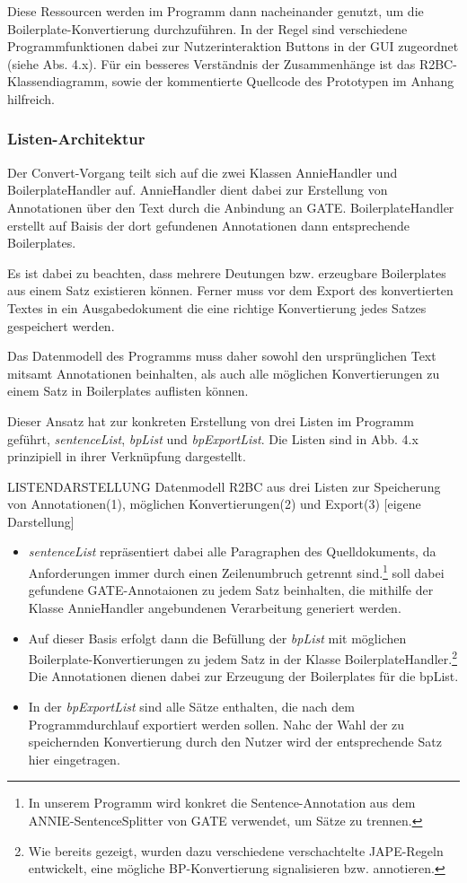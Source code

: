 \documentclass[12pt]{report}
\begin{document}
Diese Ressourcen werden im Programm dann nacheinander genutzt, um die Boilerplate-Konvertierung durchzuführen. In der Regel sind verschiedene Programmfunktionen dabei zur Nutzerinteraktion Buttons in der GUI zugeordnet (siehe Abs. 4.x). Für ein besseres Verständnis der Zusammenhänge ist das R2BC-Klassendiagramm, sowie der kommentierte Quellcode des Prototypen im Anhang hilfreich.

\subsubsection{Listen-Architektur}
Der Convert-Vorgang teilt sich auf die zwei Klassen AnnieHandler und BoilerplateHandler auf. AnnieHandler dient dabei zur Erstellung von Annotationen über den Text durch die Anbindung an GATE. BoilerplateHandler erstellt auf Baisis der dort gefundenen Annotationen dann entsprechende Boilerplates. 

Es ist dabei zu beachten, dass mehrere Deutungen bzw. erzeugbare Boilerplates aus einem Satz existieren können. Ferner muss vor dem Export des konvertierten Textes in ein Ausgabedokument die eine richtige Konvertierung jedes Satzes gespeichert werden.

Das Datenmodell des Programms muss daher sowohl den ursprünglichen Text mitsamt Annotationen beinhalten, als auch alle möglichen Konvertierungen zu einem Satz in Boilerplates auflisten können.

Dieser Ansatz hat zur konkreten Erstellung von drei Listen im Programm geführt, \textit{sentenceList}, \textit{bpList} und \textit{bpExportList}. Die Listen sind in Abb. 4.x prinzipiell in ihrer Verknüpfung dargestellt. 

LISTENDARSTELLUNG Datenmodell R2BC aus drei Listen zur Speicherung von Annotationen(1), möglichen Konvertierungen(2) und Export(3) [eigene Darstellung]

\begin{itemize}
\item \textit{sentenceList} repräsentiert dabei alle Paragraphen des Quelldokuments, da Anforderungen immer durch einen Zeilenumbruch getrennt sind.\footnote{In unserem Programm wird konkret die Sentence-Annotation aus dem ANNIE-SentenceSplitter von GATE verwendet, um Sätze zu trennen.} soll dabei gefundene GATE-Annotaionen zu jedem Satz beinhalten, die mithilfe der Klasse AnnieHandler angebundenen Verarbeitung generiert werden.
\item Auf dieser Basis erfolgt dann die Befüllung der \textit{bpList} mit möglichen Boilerplate-Konvertierungen zu jedem Satz in der Klasse BoilerplateHandler.\footnote{Wie bereits gezeigt, wurden dazu verschiedene verschachtelte JAPE-Regeln entwickelt, eine mögliche BP-Konvertierung signalisieren bzw. annotieren.} Die Annotationen dienen dabei zur Erzeugung der Boilerplates für die bpList.
\item In der \textit{bpExportList} sind alle Sätze enthalten, die nach dem Programmdurchlauf exportiert werden sollen. Nahc der Wahl der zu speichernden Konvertierung durch den Nutzer wird der entsprechende Satz hier eingetragen.
\end{itemize}
\end{document}

